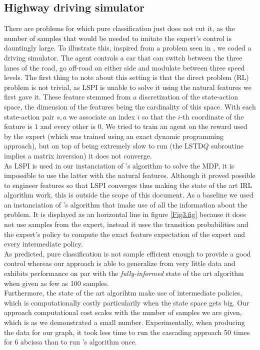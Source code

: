 \documentclass{article} %
\newcommand{\0}{\mathbf{0}}
\newcommand{\1}{\mathbf{1}}
\begin{document}
\subsection{Highway driving simulator}
There are problems for which pure classification just does not cut it, as the number of samples that would be needed to imitate the expert's control is dauntingly large. To illustrate this, inspired from a problem seen in \cite{syed2008apprenticeship,syed2008game}, we coded a driving simulator. The agent controls a car that can switch between the three lanes of the road, go off-road on either side and modulate between three speed levels. The first thing to note about this setting is that the direct problem (RL) problem is not trivial, as LSPI is unable to solve it using the natural features we first gave it. These feature stemmed from a discretization of the state-action space, the dimension of the features being the cardinality of this space. With each state-action pair $s,a$ we associate an index $i$ so that the $i$-th coordinate of the feature is $1$ and every other is $0$. We tried to train an agent on the reward used by the expert (which was trained using an exact dynamic programming approach), but on top of being extremely slow to run (the LSTD$Q$ subroutine implies a matrix inversion) it does not converge.\\
As LSPI is used in our instanciation of \cite{abbeel2004apprenticeship}'s algorithm to solve the MDP, it is impossible to use the latter with the natural features. Although it proved possible to engineer features so that LSPI converges thus making the state of the art IRL algorithm work, this is outside the scope of this document. As a baseline we used an instanciation of \cite{abbeel2004apprenticeship}'s algorithm that imake use of all the information about the problem. It is displayed as an horizontal line in figure \ref{Fig3.fig} because it does not use samples from the expert, instead it uses the transition probabilities and the expert's policy to compute the exact feature expectation of the expert and every intermediate policy.\\
As predicted, pure classification is not sample efficient enough to provide a good control whereas our approach is able to generalize from very little data and exhibits performance on par with the \emph{fully-informed} state of the art algorithm when given as few as 100 samples.\\
Furthermore, the state of the art algorihtm make use of intermediate policies, which is computationally costly particularily when the state space gets big. Our approach computational cost scales with the number of samples we are given, which is as we demonstrated a small number. Experimentally, when producing the data for our graph, it took less time to run the cascading approach 50 times for 6 abcissa than to run \cite{abbeel2004apprenticeship}'s algorithm once.\\
\end{document}

